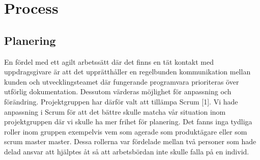 \documentclass[12pt]{article}
\begin{document}
\section{Process}

\subsection{Planering}
En fördel med ett agilt arbetssätt där det finns en tät kontakt med uppdragsgivare är att det upprätthåller en regelbunden kommunikation mellan kunden och utvecklingsteamet där fungerande programvara prioriteras över utförlig dokumentation. Dessutom värderas möjlighet för anpassning och förändring. Projektgruppen har därför valt att tillämpa Scrum [1]. Vi hade anpassning i Scrum för att det bättre skulle matcha vår situation inom projektgruppen där vi skulle ha mer frihet för planering. Det fanns inga tydliga roller inom gruppen exempelvis vem som agerade som produktägare eller som scrum master master. Dessa rollerna var fördelade mellan två personer som hade delad ansvar att hjälptes åt så att arbetsbördan inte skulle falla på en individ.    \\\\
\end{document}
